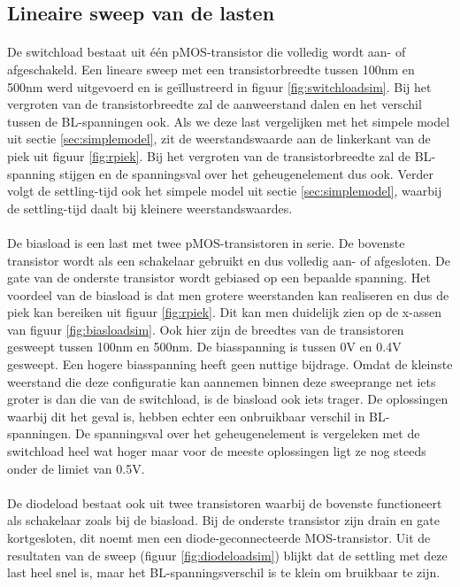 \subsection{Lineaire sweep van de lasten}\label{sec:linload}
\paragraph{}
De switchload bestaat uit \'{e}\'{e}n pMOS-transistor die volledig wordt aan- of afgeschakeld. Een lineare sweep met een transistorbreedte tussen 100nm en 500nm werd uitgevoerd en is geïllustreerd in figuur \ref{fig:switchloadsim}. Bij het vergroten van de transistorbreedte zal de aanweerstand dalen en het verschil tussen de BL-spanningen ook. Als we deze last vergelijken met het simpele model uit sectie \ref{sec:simplemodel}, zit de weerstandswaarde aan de linkerkant van de piek uit figuur \ref{fig:rpiek}. Bij het vergroten van de transistorbreedte zal de BL-spanning stijgen en de spanningsval over het geheugenelement dus ook. Verder volgt de settling-tijd ook het simpele model uit sectie \ref{sec:simplemodel}, waarbij de settling-tijd daalt bij kleinere weerstandswaardes.

\paragraph{}
De biasload is een last met twee pMOS-transistoren in serie. De bovenste transistor wordt als een schakelaar gebruikt en dus volledig aan- of afgesloten. De gate van de onderste transistor wordt gebiased op een bepaalde spanning. Het voordeel van de biasload is dat men grotere weerstanden kan realiseren en dus de piek kan bereiken uit figuur \ref{fig:rpiek}. Dit kan men duidelijk zien op de x-assen van figuur \ref{fig:biasloadsim}. Ook hier zijn de breedtes van de transistoren gesweept tussen 100nm en 500nm. De biasspanning is tussen 0V en 0.4V gesweept. Een hogere biasspanning heeft geen nuttige bijdrage. Omdat de kleinste weerstand die deze configuratie kan aannemen binnen deze sweeprange net iets groter is dan die van de switchload, is de biasload ook iets trager. De oplossingen waarbij dit het geval is, hebben echter een onbruikbaar verschil in BL-spanningen. De spanningsval over het geheugenelement is vergeleken met de switchload heel wat hoger maar voor de meeste oplossingen ligt ze nog steeds onder de limiet van 0.5V.

\paragraph{}
De diodeload bestaat ook uit twee transistoren waarbij de bovenste functioneert als schakelaar zoals bij de biasload. Bij de onderste transistor zijn drain en gate kortgesloten, dit noemt men een diode-geconnecteerde MOS-transistor. Uit de resultaten van de sweep (figuur \ref{fig:diodeloadsim}) blijkt dat de settling met deze last heel snel is, maar het BL-spanningsverschil is te klein om bruikbaar te zijn.

